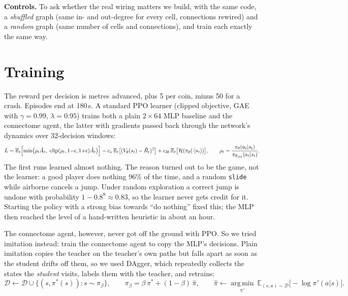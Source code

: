 \documentclass[10pt,a4paper]{article}
\begin{document}
\textbf{Controls.} To ask whether the real wiring matters we build, with the same code, a \emph{shuffled} graph
(same in- and out-degree for every cell, connections rewired) and a \emph{random} graph (same number of cells and
connections), and train each exactly the same way.

\section*{Training}
The reward per decision is metres advanced, plus 5 per coin, minus 50 for a crash. Episodes end at 180\,s.
A standard PPO learner (clipped objective, GAE with $\gamma{=}0.99$, $\lambda{=}0.95$) trains both a plain
$2{\times}64$ MLP baseline and the connectome agent, the latter with gradients passed back through the network's
dynamics over 32-decision windows:
\begin{equation}
L = \mathbb{E}_t\Bigl[\min\bigl(\rho_t\hat A_t,\ \mathrm{clip}(\rho_t,1{-}\epsilon,1{+}\epsilon)\hat A_t\bigr)\Bigr]
- c_v\,\mathbb{E}_t\bigl[(V_\theta(s_t)-\hat R_t)^2\bigr] + c_H\,\mathbb{E}_t\bigl[\mathcal H(\pi_\theta(\cdot|s_t))\bigr],
\qquad \rho_t=\frac{\pi_\theta(a_t|s_t)}{\pi_{\theta_{\text{old}}}(a_t|s_t)}.
\end{equation}
The first runs learned almost nothing. The reason turned out to be the game, not the learner: a good player
does nothing 96\% of the time, and a random \texttt{slide} while airborne cancels a jump. Under random
exploration a correct jump is undone with probability $1-0.8^{8}\approx0.83$, so the learner never gets credit
for it. Starting the policy with a strong bias towards ``do nothing'' fixed this; the MLP then reached the level
of a hand-written heuristic in about an hour.

The connectome agent, however, never got off the ground with PPO. So we tried imitation instead: train the
connectome agent to copy the MLP's decisions. Plain imitation copies the teacher on the teacher's own paths but
falls apart as soon as the student drifts off them, so we used DAgger, which repeatedly collects the states the
\emph{student} visits, labels them with the teacher, and retrains:
\begin{equation}
\mathcal D \leftarrow \mathcal D \cup \{(s, \pi^{*}(s)) : s \sim \pi_{\beta}\},\qquad
\pi_\beta = \beta\,\pi^{*} + (1-\beta)\,\hat\pi,\qquad
\hat\pi \leftarrow \operatorname*{arg\,min}_{\pi'}\ \mathbb{E}_{(s,a)\sim\mathcal D}\bigl[-\log\pi'(a|s)\bigr].
\end{equation}
\end{document}
